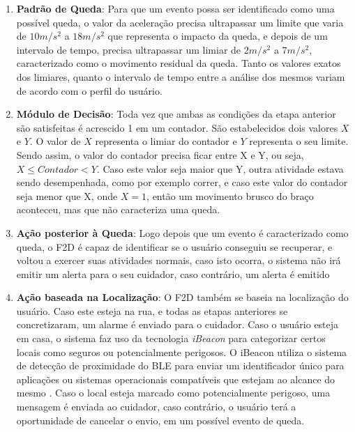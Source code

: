 \begin{enumerate}
	
	\item{\textbf{Padrão de Queda}: Para que um evento possa ser identificado como uma possível queda, o valor da aceleração precisa ultrapassar um limite que varia de $10 m/s^{2}$ a $18 m/s^{2}$ que representa o impacto da queda, e depois de um intervalo de tempo, precisa ultrapassar um limiar de $2 m/s^{2}$  a $7 m/s^{2}$, caracterizado como o movimento residual da queda. Tanto os valores exatos dos limiares, quanto o intervalo de tempo entre a análise dos mesmos variam de acordo com o  perfil do usuário.   }
	
	\item{\textbf{Módulo de Decisão}: Toda vez que ambas as condições da etapa anterior são satisfeitas é acrescido 1 em um contador. São estabelecidos dois valores $X$ e $Y$. O valor de $X$ representa o limiar do contador e $Y$ representa o seu limite. Sendo assim, o valor do contador precisa ficar entre X e Y, ou seja, $ X \leq Contador < Y $. Caso este valor seja maior que Y, outra atividade estava sendo desempenhada, como por exemplo correr, e caso este valor do contador seja menor que X, onde $X = 1$, então um movimento brusco do braço aconteceu, mas que não caracteriza uma queda.  }
	
	\item{\textbf{Ação posterior à Queda}: Logo depois que um evento é caracterizado como queda, o F2D é capaz de identificar se o usuário conseguiu se recuperar, e voltou a exercer suas atividades normais, caso isto ocorra, o sistema não irá emitir um alerta para o seu cuidador, caso contrário, um alerta é emitido }
	
	\item{\textbf{Ação baseada na Localização}: O F2D também se baseia na localização do usuário. Caso este esteja na rua, e todas as etapas anteriores se concretizaram, um alarme é enviado para o cuidador. Caso o usuário esteja em casa, o sistema faz uso da tecnologia \textit{iBeacon} para categorizar certos locais como seguros ou potencialmente perigosos. O iBeacon utiliza o sistema de detecção de proximidade do \ac{BLE} para enviar um identificador único para aplicações ou sistemas operacionais compatíveis que estejam ao alcance do mesmo \citep{kostopoulos2015f2d}.  Caso o local esteja marcado como potencialmente perigoso, uma mensagem é enviada ao cuidador, caso contrário, o usuário terá a oportunidade de cancelar o envio, em um possível evento de queda.}     	
\end{enumerate}

